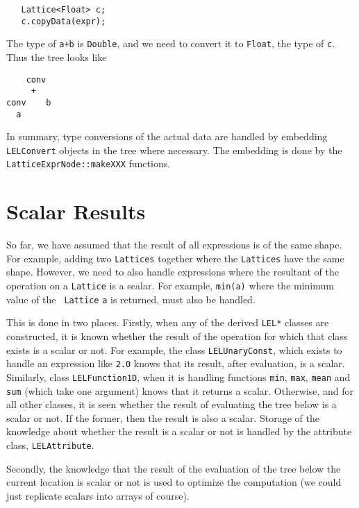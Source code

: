 \begin{verbatim}
   Lattice<Float> c;
   c.copyData(expr);
\end{verbatim}

The type of {\tt a+b} is {\tt Double}, and we need to convert
it to {\tt Float}, the type of {\tt c}.  Thus the tree looks like

\begin{verbatim}
    conv
     +
conv    b
  a
\end{verbatim}


In summary, type conversions of the actual data are handled by embedding
{\tt LELConvert} objects in the tree where necessary.  The embedding is done
by the {\tt LatticeExprNode::makeXXX} functions. 



\section {Scalar Results}


So far, we have assumed that the result of all expressions is of the
same shape.  For example, adding two {\tt Lattices} together where the
{\tt Lattices} have the same shape.  However, we need to also handle
expressions where the resultant of the operation on a {\tt Lattice} is a
scalar.  For example, {\tt min(a)} where the minimum value of the {\tt
Lattice} {\tt a} is returned, must also be handled. 

This is done in two places.  Firstly, when any of the derived {\tt LEL*}
classes are constructed, it is known whether the result of the operation
for which that class exists is a scalar or not.  For example, the class
{\tt LELUnaryConst}, which exists to handle an expression like {\tt 2.0}
knows that its result, after evaluation, is a scalar.  Similarly, class
{\tt LELFunction1D}, when it is handling functions {\tt min}, {\tt max},
{\tt mean} and {\tt sum} (which take one argument) knows that it returns
a scalar.  Otherwise, and for all other classes, it is seen whether the
result of evaluating the tree below is a scalar or not.  If the former,
then the result is also a scalar.  Storage of the knowledge about
whether the result is a scalar or not is handled by the attribute class,
{\tt LELAttribute}.

Secondly, the knowledge that the result of the evaluation of the tree
below the current location is scalar or not is used to optimize the
computation (we could just replicate scalars into arrays of course). 

